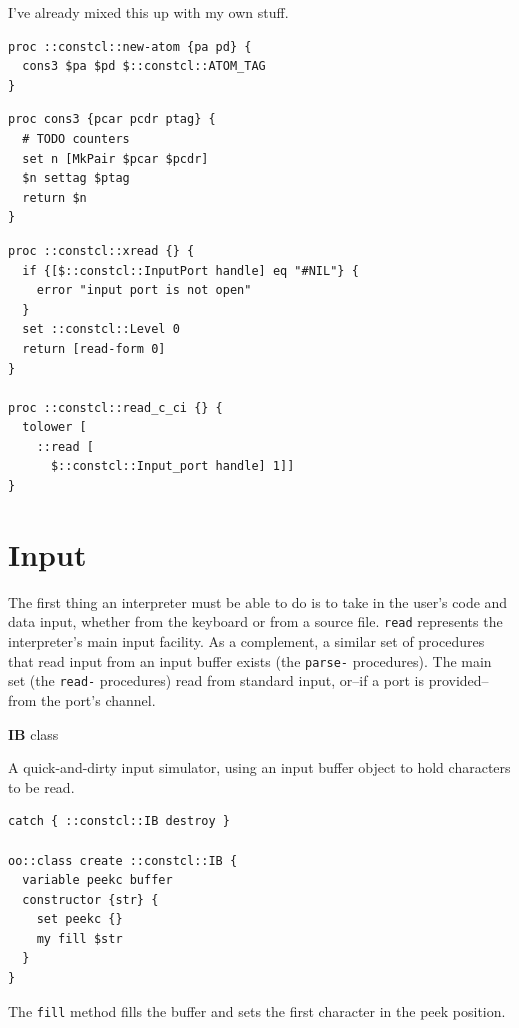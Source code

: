 \documentclass[twoside,9pt]{report}
\begin{document}
I've already mixed this up with my own stuff.

\noindent\makebox[\linewidth]{\rule{\linewidth}{0.4pt}}
\begin{lstlisting}
proc ::constcl::new-atom {pa pd} {
  cons3 $pa $pd $::constcl::ATOM_TAG
}
\end{lstlisting}
\noindent\makebox[\linewidth]{\rule{\linewidth}{0.4pt}}
\noindent\makebox[\linewidth]{\rule{\linewidth}{0.4pt}}
\begin{lstlisting}
proc cons3 {pcar pcdr ptag} {
  # TODO counters
  set n [MkPair $pcar $pcdr]
  $n settag $ptag
  return $n
}
\end{lstlisting}
\noindent\makebox[\linewidth]{\rule{\linewidth}{0.4pt}}
\noindent\makebox[\linewidth]{\rule{\linewidth}{0.4pt}}
\begin{lstlisting}
proc ::constcl::xread {} {
  if {[$::constcl::InputPort handle] eq "#NIL"} {
    error "input port is not open"
  }
  set ::constcl::Level 0
  return [read-form 0]
}
 
proc ::constcl::read_c_ci {} {
  tolower [
    ::read [
      $::constcl::Input_port handle] 1]]
}
\end{lstlisting}
\noindent\makebox[\linewidth]{\rule{\linewidth}{0.4pt}}
\chapter{Input}
\label{input}

The first thing an interpreter must be able to do is to take in the user's code and data input, whether from the keyboard or from a source file. \texttt{read} represents the interpreter's main input facility. As a complement, a similar set of procedures that read input from an input buffer exists (the \texttt{parse-} procedures). The main set (the \texttt{read-} procedures) read from standard input, or--if a port is provided--from the port's channel.


\textbf{IB} class


A quick-and-dirty input simulator, using an input buffer object to hold characters to be read.

\noindent\makebox[\linewidth]{\rule{\linewidth}{0.4pt}}
\begin{lstlisting}
catch { ::constcl::IB destroy }
 
oo::class create ::constcl::IB {
  variable peekc buffer
  constructor {str} {
    set peekc {}
    my fill $str
  }
}
\end{lstlisting}
\noindent\makebox[\linewidth]{\rule{\linewidth}{0.4pt}}

The \texttt{fill} method fills the buffer and sets the first character in the peek position.
\end{document}
